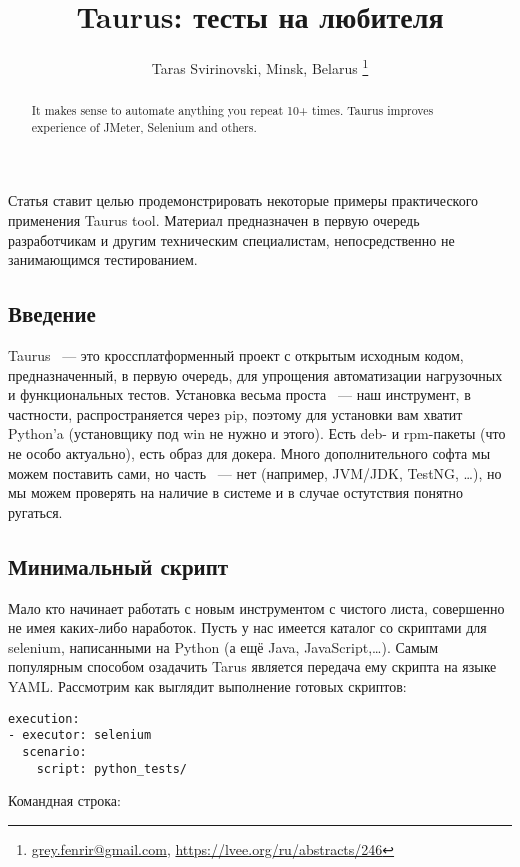 \documentclass[10pt, a5paper]{article}
\begin{document}
\title{Taurus: тесты на любителя}
\author{Taras Svirinovski, Minsk, Belarus \footnote{\url{grey.fenrir@gmail.com}, \url {https://lvee.org/ru/abstracts/246}}}
\maketitle
\begin{abstract}
It makes sense to automate anything you repeat 10+ times.
Taurus improves experience of JMeter, Selenium and others.
\end{abstract}
Статья ставит целью продемонстрировать некоторые примеры \linebreak практического применения Taurus tool. Материал предназначен в первую очередь разработчикам и другим техническим специалистам, непосредственно не занимающимся тестированием.

\subsection*{Введение}

Taurus ~--- это кроссплатформенный проект с открытым исходным кодом, предназначенный, в первую очередь, для упрощения автоматизации нагрузочных и функциональных тестов.
Установка весьма проста ~--- наш инструмент, в частности, распространяется через pip, поэтому для установки вам хватит Python'a (установщику под win не нужно и этого). Есть deb- и rpm-пакеты (что не особо актуально), есть образ для докера. 
Много дополнительного софта мы можем поставить сами, но часть ~--- нет (например, JVM/JDK, TestNG, \ldots{}), но мы можем проверять на наличие в системе и в случае остутствия понятно ругаться.

\subsection*{Минимальный скрипт}

Мало кто начинает работать с новым инструментом с чистого листа, совершенно не имея каких-либо наработок. Пусть у нас имеется каталог со скриптами для selenium, написанными на Python (а ещё Java, JavaScript,\ldots{}). Самым популярным способом озадачить Tarus является передача ему скрипта на языке YAML. Рассмотрим как выглядит выполнение готовых скриптов:

\begin{verbatim}
execution:
- executor: selenium
  scenario:
    script: python_tests/\end{verbatim}
Командная строка:
\end{document}
